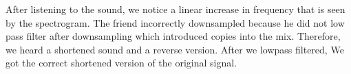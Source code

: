 \documentclass{article}
\begin{document}
\begin{center}
\end{center}
After listening to the sound, we notice a linear increase in frequency that is seen by the spectrogram. The friend incorrectly downsampled because he did not low pass filter after downsampling which introduced copies into the mix.
Therefore, we heard a shortened sound and a reverse version. After we lowpass filtered, We got the correct shortened version of the original signal.
\end{document}
